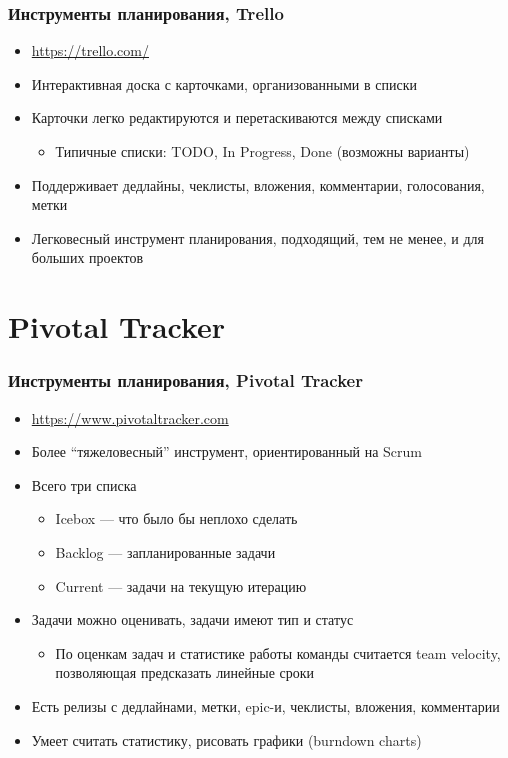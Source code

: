 \documentclass[xetex,mathserif,serif]{beamer}
\begin{document}
	\begin{frame}
		\frametitle{Инструменты планирования, Trello}
		\begin{itemize}
			\item \url{https://trello.com/}
			\item Интерактивная доска с карточками, организованными в списки
			\item Карточки легко редактируются и перетаскиваются между списками
			\begin{itemize}
				\item Типичные списки: TODO, In Progress, Done (возможны варианты)
			\end{itemize}
			\item Поддерживает дедлайны, чеклисты, вложения, комментарии, голосования, метки
			\item Легковесный инструмент планирования, подходящий, тем не менее, и для больших проектов
		\end{itemize}
	\end{frame}

	\section{Pivotal Tracker}

	\begin{frame}
		\frametitle{Инструменты планирования, Pivotal Tracker}
		\begin{itemize}
			\item \url{https://www.pivotaltracker.com}
			\item Более ``тяжеловесный'' инструмент, ориентированный на Scrum
			\item Всего три списка
			\begin{itemize}
				\item Icebox --- что было бы неплохо сделать
				\item Backlog --- запланированные задачи
				\item Current --- задачи на текущую итерацию
			\end{itemize}
			\item Задачи можно оценивать, задачи имеют тип и статус
			\begin{itemize}
				\item По оценкам задач и статистике работы команды считается team velocity, позволяющая предсказать линейные сроки
			\end{itemize}
			\item Есть релизы с дедлайнами, метки, epic-и, чеклисты, вложения, комментарии
			\item Умеет считать статистику, рисовать графики (burndown charts)
		\end{itemize}
	\end{frame}
\end{document}
